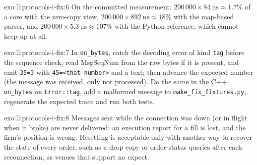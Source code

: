 \begin{solution}{exo:ll:protocols-i-fix:6}
On the committed measurement: $200\,000 \times \qty{84}{\nano\second} \approx 1.7\%$ of a core with the zero-copy view,
$200\,000 \times \qty{892}{\nano\second} \approx 18\%$ with the map-based parser, and $200\,000 \times
\qty{5.3}{\micro\second} \approx 107\%$ with the Python reference, which cannot keep up at all.
\end{solution}

\begin{solution}{exo:ll:protocols-i-fix:7}
In \texttt{on\_bytes}, catch the decoding error of kind \texttt{tag} before the sequence check, read MsgSeqNum from the raw bytes
if it is present, and emit \texttt{35=3} with \texttt{45=<that number>} and a text; then advance the expected number (the
message was received, only not processed). Do the same in the C++ \texttt{on\_bytes} on \texttt{Error::tag}, add a malformed
message to \texttt{make\_fix\_fixtures.py}, regenerate the expected trace and run both tests.
\end{solution}

\begin{solution}{exo:ll:protocols-i-fix:8}
Messages sent while the connection was down (or in flight when it broke) are never delivered: an execution report for a fill
is lost, and the firm's position is wrong. Resetting is acceptable only with another way to recover the state of every order,
such as a drop copy or order-status queries after each reconnection, as venues that support no  expect.
\end{solution}


